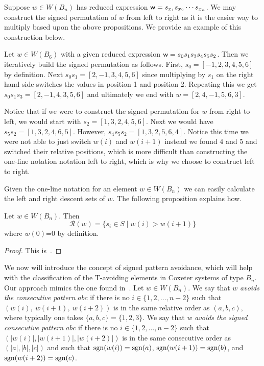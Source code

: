 Suppose $w \in W(B_n)$ has reduced expression $\mathsf{w}=s_{x_1}s_{x_2}\cdots s_{x_n}$. We may construct the signed permutation of $w$ from left to right as it is the easier way to multiply based upon the above propositions. We provide an example of this construction below.

\begin{example}
Let $w \in W(B_6)$ with a given reduced expression $\mathsf{w}=s_0s_1s_3s_4s_5s_2$. Then we iteratively build the signed permutation as follows. First, $s_0=[-1,2,3,4,5,6]$ by definition. Next $s_0s_1=[2,-1,3,4,5,6]$ since multiplying by $s_1$ on the right hand side switches the values in position 1 and position 2. Repeating this we get $s_0s_1s_3=[2,-1,4,3,5,6]$ and ultimately we end with $w=[2,4,-1,5,6,3]$. 

Notice that if we were to construct the signed permutation for $w$ from right to left, we would start with $s_2=[1,3,2,4,5,6]$. Next we would have $s_5s_2=[1,3,2,4,6,5]$. However, $s_4s_5s_2=[1,3,2,5,6,4]$. Notice this time we were not able to just switch $w(i)$ and $w(i+1)$ instead we found $4$ and $5$ and switched their relative positions, which is more difficult than constructing the one-line notation notation left to right, which is why we choose to construct left to right.
\end{example}

Given the one-line notation for an element $w \in W(B_n)$ we can easily calculate the left and right descent sets of $w$. The following proposition explains how.

\begin{proposition}\label{prop:descent}
Let $w \in W(B_n)$. Then 
\[ \mathcal{R}(w)=\{s_i \in S \mid w(i) > w(i+1)\} \]
where $w(0)$=0 by definition.
\begin{proof}
	This is~\cite[Proposition 8.1.2]{Bjorner2005}.
\end{proof}
\end{proposition}

We now will introduce the concept of signed pattern avoidance, which will help with the classification of the T-avoiding elements in Coxeter systems of type $B_n$. Our approach mimics the one found in~\cite{Gern2013a}. Let $w \in W(B_n)$. We say that $w$ \emph{avoids the consecutive pattern} $abc$ if there is no $i \in \{1,2, \ldots, n-2\}$ such that $(w(i),~w(i+1),~w(i+2))$ is in the same relative order as $(a,b,c),$ where typically one takes $\{a,b,c\}=\{1,2,3\}$. We say that $w$ \emph{avoids the signed consecutive pattern} $abc$ if there is no $i \in \{1,2, \ldots, n-2\}$ such that $\left(|w(i)|, |w(i+1)|, |w(i+2)|\right)$ is in the same consecutive order as $\left(|a|, |b|, |c| \right)$ and such that $\mathrm{sgn}(w(i))=\mathrm{sgn}(a)$, $\mathrm{sgn}(w(i+1))=\mathrm{sgn}(b)$, and $\mathrm{sgn}(w(i+2))=\mathrm{sgn}(c)$.


